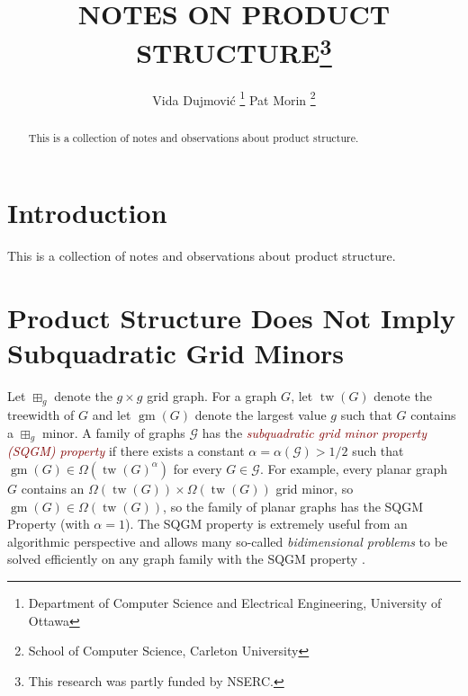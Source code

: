 \documentclass{patmorin}
\title{\MakeUppercase{Notes on Product Structure}\thanks{This research was partly funded by NSERC.}}
\author{Vida Dujmović%
    \thanks{Department of Computer Science and Electrical Engineering, University of Ottawa}\qquad
    Pat Morin%
    \thanks{School of Computer Science, Carleton University}}
\date{}
\newcommand{\defin}[1]{\textcolor{Maroon}{\emph{#1}}}
\DeclareMathOperator{\tw}{tw}
\DeclareMathOperator{\gm}{gm}
\begin{document}
\begin{titlepage}
\maketitle

\begin{abstract}
  This is a collection of notes and observations about product structure.
\end{abstract}
\end{titlepage}

\tableofcontents

\newpage
{}



\section{Introduction}

This is a collection of notes and observations about product structure.

\newpage

\section{Product Structure Does Not Imply Subquadratic Grid Minors}

Let $\boxplus_g$ denote the $g\times g$ grid graph.
For a graph $G$, let $\tw(G)$ denote the treewidth of $G$ and let $\gm(G)$ denote the largest value $g$ such that $G$ contains a $\boxplus_g$ minor.
A family of graphs $\mathcal{G}$ has the \defin{subquadratic grid minor property (SQGM) property} if there exists a constant $\alpha =\alpha(\mathcal{G}) > 1/2$ such that $\gm(G)\in\Omega(\tw(G)^{\alpha})$ for every $G\in\mathcal{G}$. For example, every planar graph $G$ contains an $\Omega(\tw(G))\times\Omega(\tw(G))$ grid minor, so $\gm(G)\in\Omega(\tw(G))$, so the family of planar graphs has the SQGM Property (with $\alpha=1$).
The SQGM property is extremely useful from an algorithmic perspective and allows many so-called \emph{bidimensional problems} to be solved efficiently on any graph family with the SQGM property \cite{fomin.lokshtanov.ea:excluded}.

\end{document}
